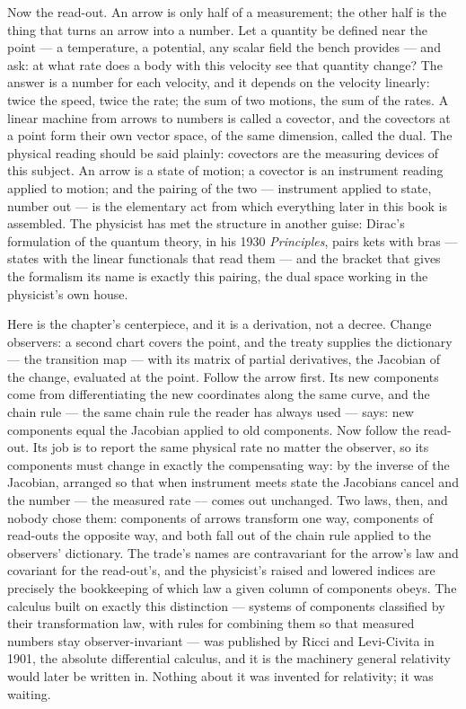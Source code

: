 Now the read-out. An arrow is only half of a measurement; the other half is
the thing that turns an arrow into a number. Let a quantity be defined near
the point --- a temperature, a potential, any scalar field the bench
provides --- and ask: at what rate does a body with this velocity see that
quantity change? The answer is a number for each velocity, and it depends
on the velocity linearly: twice the speed, twice the rate; the sum of two
motions, the sum of the rates. A linear machine from arrows to numbers is
called a covector, and the covectors at a point form their own vector
space, of the same dimension, called the dual. The physical reading should
be said plainly: covectors are the measuring devices of this subject. An
arrow is a state of motion; a covector is an instrument reading applied to
motion; and the pairing of the two --- instrument applied to state, number
out --- is the elementary act from which everything later in this book is
assembled. The physicist has met the structure in another guise: Dirac's
formulation of the quantum theory, in his 1930 \emph{Principles}, pairs
kets with bras --- states with the linear functionals that read them ---
and the bracket that gives the formalism its name is exactly this pairing,
the dual space working in the physicist's own house.

Here is the chapter's centerpiece, and it is a derivation, not a decree.
Change observers: a second chart covers the point, and the treaty supplies
the dictionary --- the transition map --- with its matrix of partial
derivatives, the Jacobian of the change, evaluated at the point. Follow
the arrow first. Its new components come from differentiating the new
coordinates along the same curve, and the chain rule --- the same chain
rule the reader has always used --- says: new components equal the Jacobian
applied to old components. Now follow the read-out. Its job is to report
the same physical rate no matter the observer, so its components must
change in exactly the compensating way: by the inverse of the Jacobian,
arranged so that when instrument meets state the Jacobians cancel and the
number --- the measured rate --- comes out unchanged. Two laws, then, and
nobody chose them: components of arrows transform one way, components of
read-outs the opposite way, and both fall out of the chain rule applied to
the observers' dictionary. The trade's names are contravariant for the
arrow's law and covariant for the read-out's, and the physicist's raised
and lowered indices are precisely the bookkeeping of which law a given
column of components obeys. The calculus built on exactly this distinction
--- systems of components classified by their transformation law, with
rules for combining them so that measured numbers stay observer-invariant
--- was published by Ricci and Levi-Civita in 1901, the absolute
differential calculus, and it is the machinery general relativity would
later be written in. Nothing about it was invented for relativity; it was
waiting.

